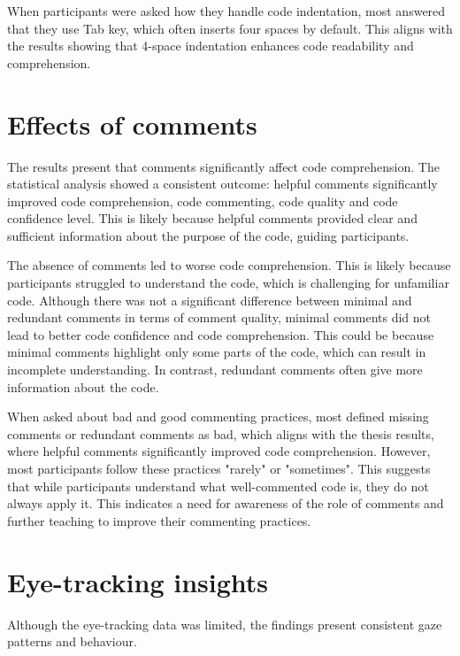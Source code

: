 When participants were asked how they handle code indentation, most answered that they use Tab key, which often inserts four spaces by default.  This aligns with the results showing that 4-space indentation enhances code readability and comprehension. 

\section{Effects of comments} 
The results present that comments significantly affect code comprehension. The statistical analysis showed a consistent outcome: helpful comments significantly improved code comprehension, code commenting, code quality and code confidence level. This is likely because helpful comments provided clear and sufficient information about the purpose of the code, guiding participants. 

The absence of comments led to worse code comprehension. This is likely because participants struggled to understand the code, which is challenging for unfamiliar code. Although there was not a significant difference between minimal and redundant comments in terms of comment quality, minimal comments did not lead to better code confidence and code comprehension. This could be because minimal comments highlight only some parts of the code,  which can result in incomplete understanding. In contrast, redundant comments often give more information about the code.   
 

When asked about bad and good commenting practices, most defined missing comments or redundant comments as bad, which aligns with the thesis results, where helpful comments significantly improved code comprehension. However, most participants follow these practices "rarely" or "sometimes". This suggests that while participants understand what well-commented code is, they do not always apply it. This indicates a need for awareness of the role of comments and further teaching to improve their commenting practices.  



\section{Eye-tracking insights} 
Although the eye-tracking data was limited, the findings present consistent gaze patterns and behaviour. 

